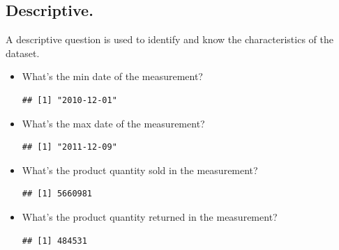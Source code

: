 \documentclass[conference]{IEEEtran}\usepackage[]{graphicx}\usepackage[]{color}
\makeatletter
\newenvironment{kframe}{%
 \def\at@end@of@kframe{}%
 \ifinner\ifhmode%
  \def\at@end@of@kframe{\end{minipage}}%
  \begin{minipage}{\columnwidth}%
 \fi\fi%
 \def\FrameCommand##1{\hskip\@totalleftmargin \hskip-\fboxsep
 \colorbox{shadecolor}{##1}\hskip-\fboxsep
     \hskip-\linewidth \hskip-\@totalleftmargin \hskip\columnwidth}%
 \MakeFramed {\advance\hsize-\width
   \@totalleftmargin\z@ \linewidth\hsize
   \@setminipage}}%
 {\par\unskip\endMakeFramed%
 \at@end@of@kframe}
\newenvironment{knitrout}{}{} %
\makeatother
\begin{document}
  \subsection{Descriptive.}
  A descriptive question is used to identify and know the characteristics of the dataset.
  \begin{itemize}
   \item What's the min date of the measurement?
\begin{knitrout}
\color{fgcolor}\begin{kframe}
\begin{verbatim}
## [1] "2010-12-01"
\end{verbatim}
\end{kframe}
\end{knitrout}
   \item What's the max date of the measurement?
\begin{knitrout}
\color{fgcolor}\begin{kframe}
\begin{verbatim}
## [1] "2011-12-09"
\end{verbatim}
\end{kframe}
\end{knitrout}
   \item What's the product quantity sold in the measurement?
\begin{knitrout}
\color{fgcolor}\begin{kframe}
\begin{verbatim}
## [1] 5660981
\end{verbatim}
\end{kframe}
\end{knitrout}
   \item What's the product quantity returned in the measurement?
\begin{knitrout}
\color{fgcolor}\begin{kframe}
\begin{verbatim}
## [1] 484531
\end{verbatim}
\end{kframe}
\end{knitrout}
  \end{itemize}
\end{document}
